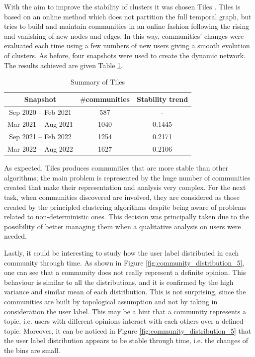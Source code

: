 \documentclass[sigchi]{acmart}
\begin{document}
With the aim to improve the stability of clusters it was chosen Tiles \cite{tiles}.
 Tiles is based on an online method which does not partition the full temporal graph, but tries to build and maintain communities in an online fashion following the rising and vanishing of new nodes and edges. In this way, communities’ changes were evaluated each time using a few numbers of new users giving a smooth evolution of clusters. As before, four snapshots were used to create the dynamic network. The results achieved are given Table \ref{tab:tiles}.

\begin{table}[h]
    \centering
        \caption{Summary of Tiles}
    \begin{tabular}{c|c|c}
         Snapshot & $\#$communities & Stability trend  \\\hline
        Sep 2020 – Feb 2021 &	587	 &     -  \\
        Mar 2021 – Aug 2021 &	1040 &	0.1445\\
        Sep 2021 – Feb 2022 &	1254 &	0.2171\\
        Mar 2022 – Aug 2022 &	1627 &	0.2106\\

    \end{tabular}

    \label{tab:tiles}
\end{table}

As expected, Tiles produces communities that are more stable than other algorithms; the main problem is represented by the huge number of communities created that make their representation and analysis very complex.
For the next task, when communities discovered are involved, they are considered as those created by the principled clustering algorithms despite being aware of problems related to non-deterministic ones. This decision was principally taken due to the possibility of better managing them when a qualitative analysis on users were needed.

Lastly, it could be interesting to study how the user label distributed in each community through time. As shown in Figure \ref{fig:community_distribution_5}, one can see that a community does not really represent a definite opinion. This behaviour is similar to all the distributions, and it is confirmed by the high variance and similar mean of each distribution. This is not surprising, since the communities are built by topological assumption and not by taking in consideration the user label. This may be a hint that a community represents a topic, i.e. users with different opinions interact with each others over a defined topic. Moreover, it can be noticed in Figure \ref{fig:community_distribution_5} that the user label distribution appears to be stable through time, i.e. the changes of the bins are small.
\end{document}
